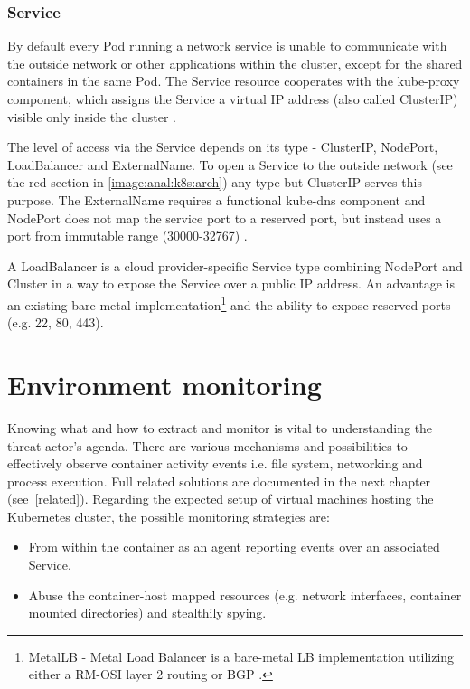 \subsubsection*{Service \label{anal:k8s:resources:service}}
By default every Pod running a network service is unable to communicate with the outside network or other applications within the cluster, except for the shared containers in the same Pod. The Service resource cooperates with the kube-proxy component, which assigns the Service a virtual IP address (also called ClusterIP) visible only inside the cluster \cite{docs:k8s:concepts:service}.

The level of access via the Service depends on its type - ClusterIP, NodePort, LoadBalancer and ExternalName. To open a Service to the outside network (see the red section in \autoref{image:anal:k8s:arch}) any type but ClusterIP serves this purpose. The ExternalName requires a functional kube-dns component and NodePort does not map the service port to a reserved port, but instead uses a port from immutable range (30000-32767) \cite{docs:k8s:concepts:service}.

A LoadBalancer is a cloud provider-specific Service type combining NodePort and Cluster in a way to expose the Service over a public IP address. An advantage is an existing bare-metal implementation\footnote{MetalLB - Metal Load Balancer is a bare-metal LB implementation utilizing either a RM-OSI layer 2 routing or BGP \cite{docs:metallb}.} and the ability to expose reserved ports (e.g. 22, 80, 443).

\section{Environment monitoring \label{anal:mon}}
Knowing what and how to extract and monitor is vital to understanding the threat actor's agenda. There are various mechanisms and possibilities to effectively observe container activity events i.e. file system, networking and process execution. Full related solutions are documented in the next chapter (see~\autoref{related}). Regarding the expected setup of virtual machines hosting the Kubernetes cluster, the possible monitoring strategies are:

\begin{itemize}[noitemsep]
	\item From within the container as an agent reporting events over an associated Service.
	\item Abuse the container-host mapped resources (e.g. network interfaces, container mounted directories) and stealthily spying.
\end{itemize}

